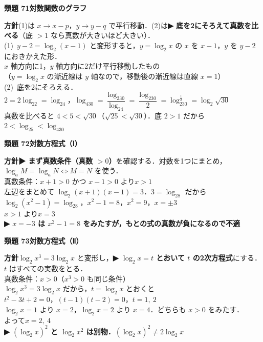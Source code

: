 \documentclass[a4paper,11pt]{ltjsarticle}
\newcommand{\ans}[2]{\Needspace{5\baselineskip}\vspace{6pt}%
  {\sffamily\bfseries 類題 #1\quad #2}\par}
\newcommand{\point}[1]{\textsf{\bfseries ▶ #1}}
\begin{document}
\ans{71}{対数関数のグラフ}
\begin{kai}
\textbf{方針}\quad (1)は $x\to x-p$，$y\to y-q$ で平行移動．(2)は\point{底を2にそろえて真数を比べる}（底 $>1$ なら真数が大きいほど大きい）．\\[2pt]
(1)\ $y-2=\log_2(x-1)$ と変形すると，$y=\log_2x$ の $x$ を $x-1$，$y$ を $y-2$ におきかえた形．\\
\hspace*{1.5em}$x$ 軸方向に1，$y$ 軸方向に2だけ平行移動したもの\\
\hspace*{1.5em}（$y=\log_2x$ の漸近線は $y$ 軸なので，移動後の漸近線は直線 $x=1$）\\[2pt]
(2)\ 底を2にそろえる．\\
\hspace*{1.5em}$2=2\log_22=\log_24$，\quad $\log_430=\dfrac{\log_230}{\log_24}=\dfrac{\log_230}{2}=\log_230^{\frac12}=\log_2\sqrt{30}$\\
\hspace*{1.5em}真数を比べると $4<5<\sqrt{30}$（$\sqrt{25}<\sqrt{30}$）．底 $2>1$ だから\\
\hspace*{1.5em}$2<\log_25<\log_430$
\end{kai}

\ans{72}{対数方程式（Ⅰ）}
\begin{kai}
\textbf{方針}\quad \point{まず真数条件（真数 $>0$）}を確認する．対数を1つにまとめ，$\log_aM=\log_aN\iff M=N$ を使う．\\[2pt]
真数条件：$x+1>0$ かつ $x-1>0$ より\quad $x>1$\\[2pt]
左辺をまとめて $\log_2(x+1)(x-1)=3$．$3=\log_28$ だから\\
\hspace*{1.5em}$\log_2(x^2-1)=\log_28$，\quad $x^2-1=8$，\quad $x^2=9$，\quad $x=\pm3$\\
$x>1$ より\quad $x=3$\\
\point{$x=-3$ は $x^2-1=8$ をみたすが，もとの式の真数が負になるので不適}
\end{kai}

\ans{73}{対数方程式（Ⅱ）}
\begin{kai}
\textbf{方針}\quad $\log_2x^3=3\log_2x$ と変形し，\point{$\log_2x=t$ とおいて $t$ の2次方程式}にする．$t$ はすべての実数をとる．\\[2pt]
真数条件：$x>0$（$x^3>0$ も同じ条件）\\
$\log_2x^3=3\log_2x$ だから，$t=\log_2x$ とおくと\\
\hspace*{1.5em}$t^2-3t+2=0$，\quad $(t-1)(t-2)=0$，\quad $t=1,\ 2$\\
$\log_2x=1$ より $x=2$，\quad $\log_2x=2$ より $x=4$．どちらも $x>0$ をみたす．\\[2pt]
よって\quad $x=2,\ 4$\\
\point{$(\log_2x)^2$ と $\log_2x^2$ は別物．$(\log_2x)^2\neq2\log_2x$}
\end{kai}
\end{document}
